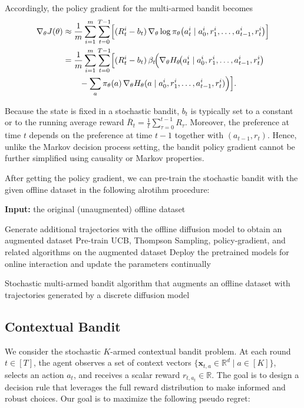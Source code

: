Accordingly, the policy gradient for the multi-armed bandit becomes
\[
\begin{aligned}
\nabla_{\theta}J(\theta)
&\approx
\frac{1}{m}\sum_{i=1}^{m}\sum_{t=0}^{T-1}
\Bigl[(R_t^i-b_t)\,
\nabla_{\theta}\log\pi_{\theta}
\bigl(a_t^i \mid a_0^i, r_1^i,\ldots,a_{t-1}^i,r_t^i\bigr)\Bigr]
\\
&=
\frac{1}{m}\sum_{i=1}^{m}\sum_{t=0}^{T-1}
\Bigl[(R_t^i-b_t)\,\beta_t\!
\Bigl(
\nabla_{\theta}H_{\theta}\!\bigl(a_t^i \mid a_0^i, r_1^i,\ldots,a_{t-1}^i,r_t^i\bigr)
\\
&\qquad
-\sum_{a}\pi_{\theta}(a)\,
\nabla_{\theta}H_{\theta}
(a \mid a_0^i, r_1^i,\ldots,a_{t-1}^i,r_t^i)
\Bigr)\Bigr].
\end{aligned}
\]

Because the state is fixed in a stochastic bandit, $b_t$ is typically set to a constant or to the running average reward $\bar{R}_t=\tfrac{1}{t}\sum_{\tau=0}^{t-1}R_{\tau}$.  
Moreover, the preference at time $t$ depends on the preference at time $t-1$ together with $(a_{t-1},r_t)$.  
Hence, unlike the Markov decision process setting, the bandit policy gradient cannot be further simplified using causality or Markov properties.

After getting the policy gradient, we can pre-train the stochastic bandit with the given offline dataset in the following alrotihm procedure:
\begin{algorithm}[H]
    \textbf{Input:} the original (unaugmented) offline dataset
    \begin{algorithmic}[1]
      \State Generate additional trajectories with the offline diffusion model to obtain an augmented dataset
      \State Pre-train UCB, Thompson Sampling, policy-gradient, and related algorithms on the augmented dataset
      \State Deploy the pretrained models for online interaction and update the parameters continually
    \end{algorithmic}
    \label{alg:stochastic_bandit_pretrained}
    \caption{Stochastic multi-armed bandit algorithm that augments an offline dataset with trajectories generated by a discrete diffusion model}
\end{algorithm}


\subsection{Contextual Bandit}
We consider the stochastic $K$-armed contextual bandit problem. At each round $t \in [T]$, the agent observes a set of context vectors $\{\mathbf{x}_{t,a} \in \mathbb{R}^d \mid a \in [K]\}$, selects an action $a_t$, and receives a scalar reward $r_{t,a_t} \in \mathbb{R}$. The goal is to design a decision rule that leverages the full reward distribution to make informed and robust choices.
Our goal is to maximize the following pseudo regret:

